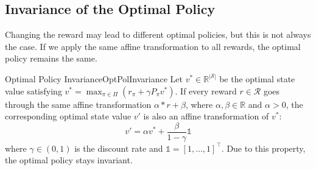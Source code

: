     \subsection{Invariance of the Optimal Policy}
        Changing the reward may lead to different optimal policies, but this is not always the case. If we apply the same affine transformation
        to all rewards, the optimal policy remains the same.
        \begin{thm}{Optimal Policy Invariance}{OptPolInvariance}
            Let $v^* \in \mathbb{R}^{|\mathcal{S}|}$ be the optimal state value satisfying $v^* = \max_{\pi \in \Pi}{(r_\pi + \gamma P_\pi v^*)}$.
            If every reward $r \in \mathcal{R}$ goes through the same affine transformation $\alpha * r + \beta$, where $\alpha, \beta \in \mathbb{R}$ and $\alpha > 0$,
            the corresponding optimal state value $v'$ is also an affine transformation of $v^*$:
            \begin{equation}
                v' = \alpha v^* + \frac{\beta}{1 - \gamma}\mathbb{1}
            \end{equation}
            where $\gamma \in (0,1)$ is the discount rate and $\mathbb{1} = [1,\dots,1]^\top$.
            Due to this property, the optimal policy stays invariant.
        \end{thm}
